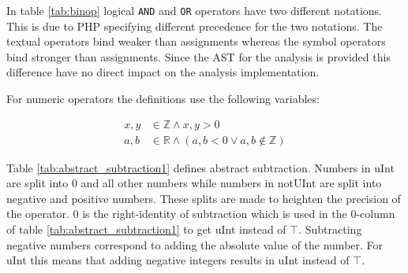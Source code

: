 In table \ref{tab:binop} logical \texttt{AND} and \texttt{OR} operators have two different notations. This is due to PHP specifying different precedence for the two notations. The textual operators bind weaker than assignments whereas the symbol operators bind stronger than assignments. Since the AST for the analysis is provided this difference have no direct impact on the analysis implementation.

For numeric operators the definitions use the following variables:

\begin{align*}
x, y &\in \mathbb{Z} \wedge x, y > 0 \\
a, b &\in \mathbb{R} \wedge (a, b < 0 \vee a, b \notin \mathbb{Z})
\end{align*}




Table \ref{tab:abstract_subtraction1} defines abstract subtraction. Numbers in uInt are split into 0 and all other numbers while numbers in notUInt are split into negative and positive numbers. These splits are made to heighten the precision of the operator. 0 is the right-identity of subtraction which is used in the 0-column of table \ref{tab:abstract_subtraction1} to get uInt instead of $\top$. Subtracting negative numbers correspond to adding the absolute value of the number. For uInt this means that adding negative integers results in uInt instead of $\top$.

